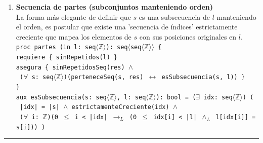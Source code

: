 \begin{enumerate}[label=\textbf{\alph*)}]
    \vspace{0.4cm}
    \item \textbf{Secuencia de partes (subconjuntos manteniendo orden)} \\
    La forma más elegante de definir que $s$ es una subsecuencia de $l$ manteniendo el orden, es postular que existe una 'secuencia de índices' estrictamente creciente que mapea los elementos de $s$ con sus posiciones originales en $l$. \\
    \texttt{proc partes (in l: seq$\langle\mathbb{Z}\rangle$): seq$\langle$seq$\langle\mathbb{Z}\rangle\rangle$ \{} \\
    \texttt{\hspace*{0.5cm}requiere \{ sinRepetidos(l) \}} \\
    \texttt{\hspace*{0.5cm}asegura \{ sinRepetidosSeq(res) $\wedge$} \\
    \texttt{\hspace*{1.0cm} ($\forall$ s: seq$\langle\mathbb{Z}\rangle$)(perteneceSeq(s, res) $\leftrightarrow$ esSubsecuencia(s, l)) \}} \\
    \texttt{\}} \\
    \texttt{aux esSubsecuencia(s: seq$\langle\mathbb{Z}\rangle$, l: seq$\langle\mathbb{Z}\rangle$): bool = ($\exists$ idx: seq$\langle\mathbb{Z}\rangle$) (} \\
    \texttt{\hspace*{0.5cm} |idx| = |s| $\wedge$ estrictamenteCreciente(idx) $\wedge$} \\
    \texttt{\hspace*{0.5cm} ($\forall$ i: $\mathbb{Z}$)(0 $\leq$ i < |idx| $\rightarrow_L$ (0 $\leq$ idx[i] < |l| $\wedge_L$ l[idx[i]] = s[i])) )}
\end{enumerate}

\vspace{0.5cm}
\hrule
\vspace{0.5cm}
